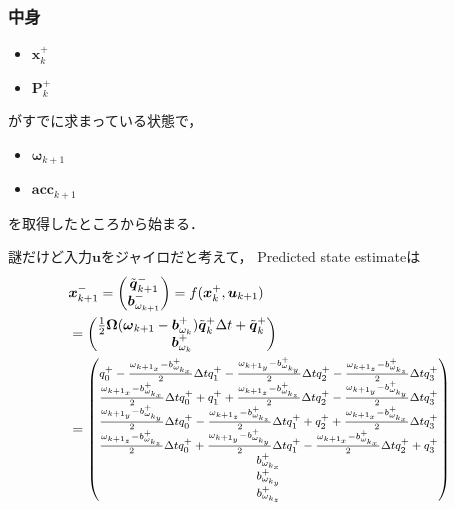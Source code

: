 \subsubsection{中身}
\begin{itemize}
  \item $\boldsymbol{x}_{k}^{+}$
  \item $\boldsymbol{P}_{k}^{+}$
\end{itemize}
がすでに求まっている状態で，
\begin{itemize}
  \item $\boldsymbol{\omega}_{k+1}$
  \item $\boldsymbol{acc}_{k+1}$
\end{itemize}
を取得したところから始まる．

謎だけど入力$\boldsymbol{u}$をジャイロだと考えて，
Predicted state estimateは
\newcommand*{\omegawithbias}[1]{
  \frac{\omega_{{k+1}_#1} - b_{\omega_{{k}_#1}}^{+}}{2}\Delta t
}
\newcommand*{\tmpbibun}[1]{
  \frac{\Delta t q_{#1}^{+}}{2}
}
\begin{align}
  &\boldsymbol{x}_{k+1}^{-} =
  \begin{pmatrix}
    \tilde{\boldsymbol{q}}_{k+1}^{-}\\
    \boldsymbol{b}_{{\omega}_{k+1}}^{-}
  \end{pmatrix} = f(\boldsymbol{x}_{k}^{+}, \boldsymbol{u}_{k+1})\\
  &=
  \begin{pmatrix}
    \frac{1}{2}
    \boldsymbol{\Omega}(\boldsymbol{\omega}_{k+1} - \boldsymbol{b}_{{\omega}_{k}}^{+})
    \tilde{\boldsymbol{q}}_{k}^{+}
    \Delta t +
    \tilde{\boldsymbol{q}}_{k}^{+}\\
    \boldsymbol{b}_{{\omega}_{k}}^{+}
  \end{pmatrix}\\
  &= {\footnotesize
    \setlength\arraycolsep{1pt}
    \begin{pmatrix}
      q_0^{+} -\omegawithbias{x}q_1^{+} -\omegawithbias{y}q_2^{+} -\omegawithbias{z}q_3^{+}\\
      \omegawithbias{x} q_0^{+} +         q_1^{+} +  \omegawithbias{z}q_2^{+} -\omegawithbias{y}q_3^{+}\\
      \omegawithbias{y} q_0^{+} -\omegawithbias{z}q_1^{+} +         q_2^{+} + \omegawithbias{x}q_3^{+}\\
      \omegawithbias{z} q_0^{+} +\omegawithbias{y}q_1^{+} -\omegawithbias{x}q_2^{+} +         q_3^{+}\\
      b_{\omega_{k_x}}^{+}\\
      b_{\omega_{k_y}}^{+}\\
      b_{\omega_{k_z}}^{+}
    \end{pmatrix}
  }
\end{align}
